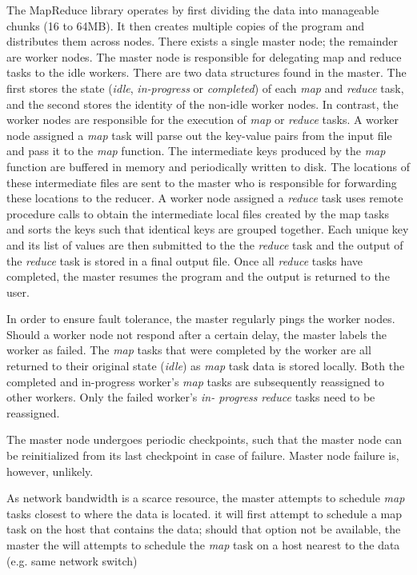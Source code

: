 \documentclass{report}
\begin{document}
The MapReduce library operates by first dividing the data into manageable chunks (16 to 64MB). It 
then creates multiple copies of the program and distributes them across nodes. There exists a 
single master node; the remainder are worker nodes. The master node is responsible for 
delegating map and reduce tasks to the idle workers. There are two data structures found in the 
master. The first stores the state (\textit{idle}, \textit{in-progress} or \textit{completed}) of each 
\textit{map} and \textit{reduce} task, and the second stores the identity of the non-idle worker 
nodes. In contrast, the worker nodes are responsible for the execution of \textit{map} or 
\textit{reduce} tasks. A worker node assigned a \textit{map} task will parse out the key-value pairs 
from the input file and pass it to the \textit{map} function. The intermediate keys produced by the 
\textit{map} function are buffered in memory and periodically written to disk. The locations of these
intermediate files are sent to the master who is responsible for forwarding these locations to the 
reducer. A worker node assigned a \textit{reduce} task uses remote procedure calls to obtain the 
intermediate local files created by the map tasks and sorts the keys such that identical keys are 
grouped together. Each unique key and its list of values are then submitted to the the 
\textit{reduce} task and the output of the \textit{reduce} task is stored in a final output file. Once all 
\textit{reduce} tasks have completed, the master resumes the program and the 
output is returned to the user.

In order to ensure fault tolerance, the master regularly pings the worker nodes. Should a worker 
node not respond after a certain delay, the master labels the worker as failed. The \textit{map} 
tasks that were completed by the worker are all returned to their original state (\textit{idle}) as 
\textit{map} task data is stored locally. Both the completed and in-progress worker's 
\textit{map} tasks are subsequently reassigned to other workers. Only the failed worker's \textit{in-
progress} \textit{reduce} tasks need to be reassigned.

The master node undergoes periodic checkpoints, such that the master node can be reinitialized 
from its last checkpoint in case of failure. Master node failure is, however, unlikely.

As network bandwidth is a scarce resource, the master attempts to schedule \textit{map} tasks 
closest to where the data is located. it will first attempt to schedule a map task on the host that 
contains the data; should that option not be available, the master the will attempts to 
schedule the \textit{map} task on a host nearest to the data (e.g. same network switch)
\end{document}
